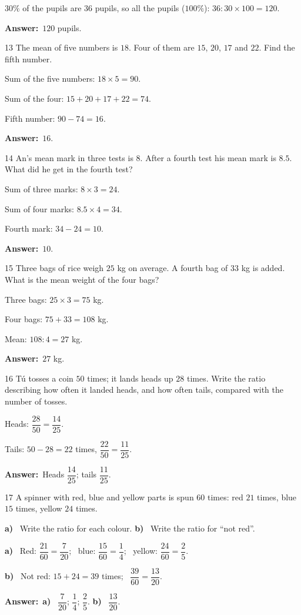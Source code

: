 \documentclass[11pt]{article}
\newif\ifsol \solfalse
\providecommand{\AnsWord}{Đáp số}
\newcommand{\dapso}[1]{\par\textbf{\AnsWord:}\ #1}
\newcommand{\probsol}[1]{%
  \begin{lrbox}{\solmeasure}\begin{minipage}{\dimexpr\linewidth-24pt\relax}#1\end{minipage}\end{lrbox}%
  \ifsol
    \begin{solbox}#1\end{solbox}%
  \else
    \setlength{\solht}{\dimexpr\ht\solmeasure+\dp\solmeasure+0.85cm\relax}%
    \ifdim\solht<1.35cm\setlength{\solht}{1.35cm}\fi
    \begin{tcolorbox}[colback=white,colframe=Line,boxrule=0.8pt,arc=5pt,
      left=8pt,right=8pt,top=4pt,bottom=4pt,height=\solht]{\footnotesize\color{Slate}\itshape\WorkWord}\end{tcolorbox}%
  \fi}
\newcommand{\pa}[1]{\textbf{#1)}\ }
\newcommand{\gap}{\vspace{0.3cm}}
\def\WorkWord{Your work:}
\def\AnsWord{Answer}
\begin{document}
\probsol{
$30\%$ of the pupils are $36$ pupils, so all the pupils ($100\%$): $36:30\times100=120$.
\dapso{$120$ pupils.}}
\gap
\begin{probbox}{13}{\relax}
The mean of five numbers is $18$. Four of them are $15$, $20$, $17$ and $22$. Find the fifth number.
\end{probbox}
\probsol{
Sum of the five numbers: $18\times5=90$.\par Sum of the four: $15+20+17+22=74$.\par Fifth number: $90-74=16$.
\dapso{$16$.}}
\gap
\begin{probbox}{14}{\relax}
An's mean mark in three tests is $8$. After a fourth test his mean mark is $8.5$. What did he get in the fourth test?
\end{probbox}
\probsol{
Sum of three marks: $8\times3=24$.\par Sum of four marks: $8.5\times4=34$.\par Fourth mark: $34-24=10$.
\dapso{$10$.}}
\gap
\begin{probbox}{15}{\relax}
Three bags of rice weigh $25$ kg on average. A fourth bag of $33$ kg is added. What is the mean weight of the four bags?
\end{probbox}
\probsol{
Three bags: $25\times3=75$ kg.\par Four bags: $75+33=108$ kg.\par Mean: $108:4=27$ kg.
\dapso{$27$ kg.}}
\gap
\begin{probbox}{16}{\relax}
Tú tosses a coin $50$ times; it lands heads up $28$ times. Write the ratio describing how often it landed heads, and how often tails, compared with the number of tosses.
\end{probbox}
\probsol{
Heads: $\dfrac{28}{50}=\dfrac{14}{25}$.\par Tails: $50-28=22$ times, $\dfrac{22}{50}=\dfrac{11}{25}$.
\dapso{Heads $\dfrac{14}{25}$; tails $\dfrac{11}{25}$.}}
\gap
\begin{probbox}{17}{\relax}
A spinner with red, blue and yellow parts is spun $60$ times: red $21$ times, blue $15$ times, yellow $24$ times.\par
\pa{a} Write the ratio for each colour. \quad \pa{b} Write the ratio for ``not red''.
\end{probbox}
\probsol{
\pa{a} Red: $\dfrac{21}{60}=\dfrac{7}{20}$; \ blue: $\dfrac{15}{60}=\dfrac14$; \ yellow: $\dfrac{24}{60}=\dfrac25$.\par
\pa{b} Not red: $15+24=39$ times; \ $\dfrac{39}{60}=\dfrac{13}{20}$.
\dapso{\pa{a} $\dfrac{7}{20}$; $\dfrac14$; $\dfrac25$. \pa{b} $\dfrac{13}{20}$.}}
\end{document}

